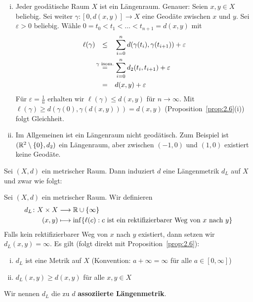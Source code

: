 \begin{beispiel}
\label{bsp:2.8}
	\begin{enumerate}[(i)]
		\item Jeder geodätische Raum $X$ ist ein Längenraum.
		Genauer:
		Seien $x,y \in X$ beliebig.
		Sei weiter $\gamma\colon [0,d(x,y)] \rightarrow X$ eine Geodäte zwischen $x$ und $y$.
		Sei $\varepsilon > 0$ beliebig.
		Wähle $0 = t_0 < t_1 < \dots < t_{n+1} = d(x,y)$ mit
		\begin{align*}
			\ell(\gamma) &\stack{}{\leq} \sum\limits_{i=0}^{n} d(\gamma(t_i),\gamma(t_{i+1})) + \varepsilon \\
			&\stack{\gamma\text{ isom.}}{=} \sum\limits_{i=0}^{n} d_2(t_i,t_{i+1}) + \varepsilon \\
			&\stack{}{=} d(x,y) + \varepsilon
		\end{align*}
		Für $\varepsilon = \frac{1}{n}$ erhalten wir $\ell(\gamma) \leq d(x,y)$ für $n \rightarrow \infty$. Mit $\ell(\gamma) \geq d(\gamma(0),\gamma(d(x,y))) = d(x,y)$ (Proposition~\ref{prop:2.6}(i)) folgt Gleichheit.
		\item Im Allgemeinen ist ein Längenraum nicht geodätisch.
		Zum Beispiel ist $(\mathbb{R}^2 \setminus \{0\},d_2)$ ein Längenraum, aber zwischen $(-1,0)$ und $(1,0)$ existiert keine Geodäte.
	\end{enumerate}
\end{beispiel}

Sei $(X,d)$ ein metrischer Raum.
Dann induziert $d$ eine Längenmetrik $d_L$ auf $X$ und zwar wie folgt:

\begin{definition}
\label{def:2.9}
	Sei $(X,d)$ ein metrischer Raum.
	Wir definieren
	\begin{align*}
		d_L \colon X \times X &\longrightarrow \mathbb{R} \cup \{\infty\} \\
		(x,y) &\longmapsto \inf\{ \ell(c) : c \text{ ist ein rektifizierbarer Weg von } x \text{ nach } y\}
	\end{align*}	
	Falls kein rektifizierbarer Weg von $x$ nach $y$ existiert, dann setzen wir $d_L(x,y) = \infty$.
	Es gilt (folgt direkt mit Proposition~\ref{prop:2.6}):
	\begin{enumerate}[(i)]
		\item $d_L$ ist eine Metrik auf $X$ (Konvention: $a + \infty = \infty$ für alle $a \in [0,\infty]$)
		\item $d_L(x,y) \geq d(x,y)$ für alle $x,y \in X$
	\end{enumerate}
	Wir nennen $d_L$ die zu $d$ \textbf{assoziierte Längenmetrik}. 
\end{definition}

